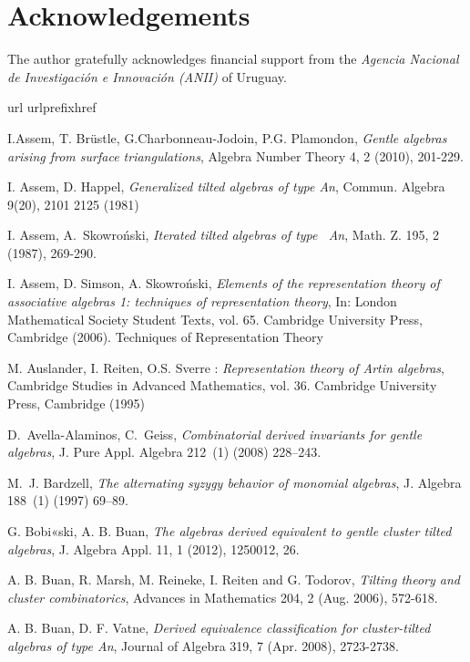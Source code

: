\documentclass{amsart}
\theoremstyle{plain}
\theoremstyle{definition}
\begin{document}
\section*{Acknowledgements}
The author gratefully  acknowledges financial support from  the  \emph{Agencia Nacional de Investigaci\'{o}n e Innovaci\'{o}n (ANII)} of Uruguay.

\begin{thebibliography}{10} \expandafter\ifx\csname url\endcsname\relax
  \fi
\expandafter\ifx\csname urlprefix\endcsname\relax\fi \expandafter\ifx\csname href\endcsname\relax
   \fi

 I.Assem, T. Brüstle, G.Charbonneau-Jodoin,  P.G. Plamondon,  \textit{Gentle algebras arising from
surface triangulations}, Algebra Number Theory 4, 2 (2010), 201-229.

 I. Assem,  D. Happel, \textit{Generalized tilted algebras of type An}, Commun. Algebra 9(20), 2101
2125 (1981)

 I. Assem, A.~Skowro{\'n}ski, \textit{Iterated tilted algebras of type ~An}, Math. Z. 195, 2 (1987), 269-290.

 I. Assem, D. Simson, A. Skowro{\'n}ski, \textit{Elements of the representation theory of associative
algebras 1: techniques of representation theory}, In: London Mathematical Society Student
Texts, vol. 65. Cambridge University Press, Cambridge (2006). Techniques of Representation
Theory

 M. Auslander, I. Reiten, O.S. Sverre : \textit{Representation theory of Artin algebras}, Cambridge
Studies in Advanced Mathematics, vol. 36. Cambridge University Press, Cambridge (1995)

 D.~Avella-Alaminos, C.~Geiss, \textit{Combinatorial derived invariants for gentle algebras}, J. Pure Appl. Algebra 212~(1) (2008) 228--243.

 M.~J. Bardzell, \textit{The alternating syzygy behavior of monomial algebras}, J. Algebra 188~(1) (1997) 69--89.

 G. Bobi«ski, A. B. Buan,  \textit{The algebras derived equivalent to gentle cluster tilted algebras}, J. Algebra
Appl. 11, 1 (2012), 1250012, 26.

 A. B. Buan, R. Marsh, M. Reineke, I. Reiten and  G. Todorov, \textit{Tilting theory and cluster combinatorics},
Advances in Mathematics 204, 2 (Aug. 2006), 572-618.

 A. B. Buan, D. F. Vatne,  \textit{Derived equivalence classification for cluster-tilted algebras of type An},
Journal of Algebra 319, 7 (Apr. 2008), 2723-2738.


\end{thebibliography}
\end{document}
